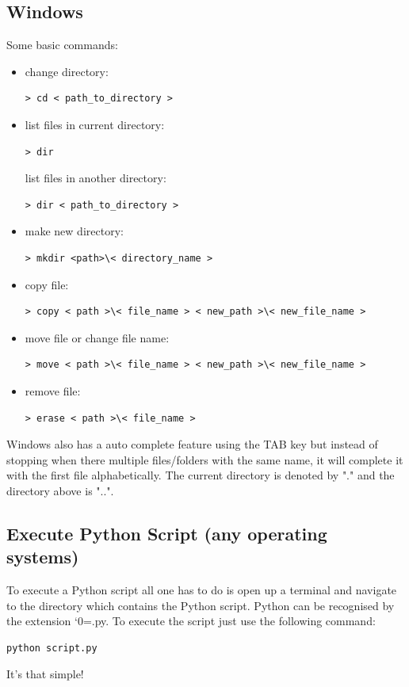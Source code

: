 \documentclass{SciPost}
\newcommand\0{\scalebox{-1}[1]{0}}
\let\svttfamily\ttfamily
\renewcommand\ttfamily{\svttfamily\catcode`0=\active }
\renewcommand\texttt{\bgroup\ttfamily\texttthelp}
\def\texttthelp#1{#1\egroup}
\begin{document}
\begin{appendix}
\subsection{Windows}
Some basic commands:

\begin{itemize}
	\item change directory:
	\begin{lstlisting}[numbers=none,keywordstyle=\ttfamily]
	> cd < path_to_directory >
	\end{lstlisting}
	\item list files in current directory:
	\begin{lstlisting}[numbers=none,keywordstyle=\ttfamily]
	> dir
	\end{lstlisting}
	list files in another directory:
	\begin{lstlisting}[numbers=none,keywordstyle=\ttfamily]
	> dir < path_to_directory >
	\end{lstlisting}
	\item make new directory:
	\begin{lstlisting}[numbers=none,keywordstyle=\ttfamily]
	> mkdir <path>\< directory_name >
	\end{lstlisting}
	\item copy file:
	\begin{lstlisting}[numbers=none,keywordstyle=\ttfamily]
	> copy < path >\< file_name > < new_path >\< new_file_name >
	\end{lstlisting}
	\item move file or change file name:
	\begin{lstlisting}[numbers=none,keywordstyle=\ttfamily]
	> move < path >\< file_name > < new_path >\< new_file_name >
	\end{lstlisting}
	\item remove file:
	\begin{lstlisting}[numbers=none,keywordstyle=\ttfamily]
	> erase < path >\< file_name >
	\end{lstlisting}
	
\end{itemize}
Windows also has a auto complete feature using the TAB key but instead of stopping when there multiple files/folders with the same name, it will complete it with the first file alphabetically. The current directory is denoted by "." and the directory above is "..".

\subsection{Execute Python Script (any operating systems)}
%
To execute a Python script all one has to do is open up a terminal and navigate to the directory which contains the Python script. Python can be recognised by the extension \texttt{.py}. To execute the script just use the following command:
\begin{lstlisting}[numbers=none,keywordstyle=\ttfamily]
python script.py
\end{lstlisting}
It's that simple!


\end{appendix}
\end{document}
